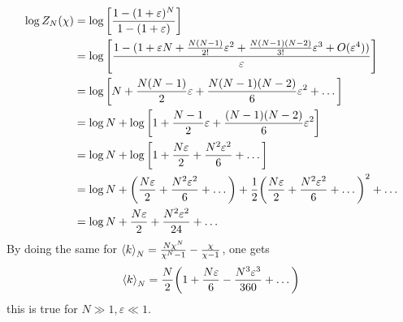 \documentclass[../main/main.tex]{subfiles}
\begin{document}
\begin{equation}
\begin{split}
  \log{Z_N} (\chi)  &=  \log{\qty[\frac{1-(1+\varepsilon )^N}{1-(1+\varepsilon )}] }  \\
  & =   \log{\qty[\frac{1-(1+\varepsilon N  + \frac{N(N-1)}{2!}\varepsilon ^2 + \frac{N(N-1)(N-2)}{3!}\varepsilon ^3 +O(\varepsilon ^4))}{\varepsilon }] } \\
  & = \log{\qty[N + \frac{N(N-1)}{2}\varepsilon + \frac{N(N-1)(N-2)}{6}\varepsilon^2 + \dots]  } \\
  & = \log{N} + \log{\qty[1+\frac{N-1}{2}\varepsilon +\frac{(N-1)(N-2)}{6}\varepsilon ^2] } \\
  & = \log{N} + \log{\qty[1+ \frac{N \varepsilon }{2}+ \frac{N^2 \varepsilon ^2}{6}+ \dots] }  \\
  & = \log{N} + \qty( \frac{N \varepsilon }{2} + \frac{N^2 \varepsilon ^2}{6} + \dots) + \frac{1}{2} \qty(\frac{N \varepsilon }{2} + \frac{N^2 \varepsilon ^2}{6} + \dots)^2  + \dots  \\
  & = \log{N}+ \frac{N \varepsilon }{2} + \frac{N^2 \varepsilon ^2}{24} + \dots
\end{split}
\end{equation}
By doing the same for \(   \expval{k}_N = \frac{N \chi^N}{\chi^N-1} - \frac{\chi}{\chi-1} \), one gets
\begin{equation}
  \expval{k}_N = \frac{N}{2} \qty( 1 + \frac{N \varepsilon }{6} - \frac{N^3 \varepsilon ^3}{360} + \dots)
\end{equation}
this is true for \( N \gg 1, \varepsilon \ll 1 \).
\end{document}
